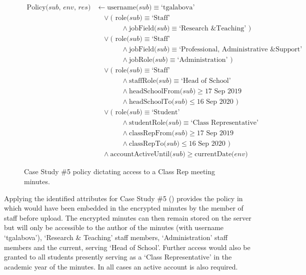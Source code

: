 \begin{figure}[ht]
  \centering
\begin{align*}
  \text{Policy($sub$, $env$, $res$)}
  &
    \leftarrow
    \text{username($sub$)} \equiv \text{`tgalabova'}
  \\
  &
    \phantom{::}\vee
    \text{( role($sub$)} \equiv \text{`Staff'}
  \\
  &
    \phantom{::::::::}\wedge
    \text{jobField($sub$)} \equiv \text{`Research \& Teaching' )}
  \\
  &
    \phantom{::}\vee
    \text{( role($sub$)} \equiv \text{`Staff'}
  \\
  &
    \phantom{::::::::}\wedge
    \text{jobField($sub$)} \equiv \text{`Professional, Administrative \& Support'}
  \\
  &
    \phantom{::::::::}\wedge
    \text{jobRole($sub$)} \equiv \text{`Administration' )}
  \\
  &
    \phantom{::}\vee
    \text{( role($sub$)} \equiv \text{`Staff'}
  \\
  &
    \phantom{::::::::}\wedge
    \text{staffRole($sub$)} \equiv \text{`Head of School'}
  \\
  &
    \phantom{::::::::}\wedge
    \text{headSchoolFrom($sub$)} \geq \text{17 Sep 2019}
  \\
  &
    \phantom{::::::::}\wedge
    \text{headSchoolTo($sub$)} \leq \text{16 Sep 2020 )}
  \\
  &
    \phantom{::}\vee
    \text{( role($sub$)} \equiv \text{`Student'}
  \\
  &
    \phantom{::::::::}\wedge
    \text{studentRole($sub$)} \equiv \text{`Class Representative'}
  \\
  &
    \phantom{::::::::}\wedge
    \text{classRepFrom($sub$)} \geq \text{17 Sep 2019}
  \\
  &
    \phantom{::::::::}\wedge
    \text{classRepTo($sub$)} \leq \text{16 Sep 2020 )}
  \\
  &
    \phantom{::}\wedge
    \text{accountActiveUntil($sub$)} \geq \text{currentDate($env$)}
\end{align*}
  \caption{
    \label{fig:case_study_policy_5}
    Case Study \#5 policy dictating access to a Class Rep meeting minutes.
  }
\end{figure}

Applying the identified attributes for Case Study \#5 () provides the \thePolicyLang policy in  which would have been embedded in the encrypted minutes by the member of staff before upload. The encrypted minutes can then remain stored on the server but will only be accessible to the author of the minutes (with username `tgalabova'), `Research \& Teaching' staff members, `Administration' staff members and the current, serving `Head of School'. Further access would also be granted to all students presently serving as a `Class Representative' in the academic year of the minutes. In all cases an active account is also required.
